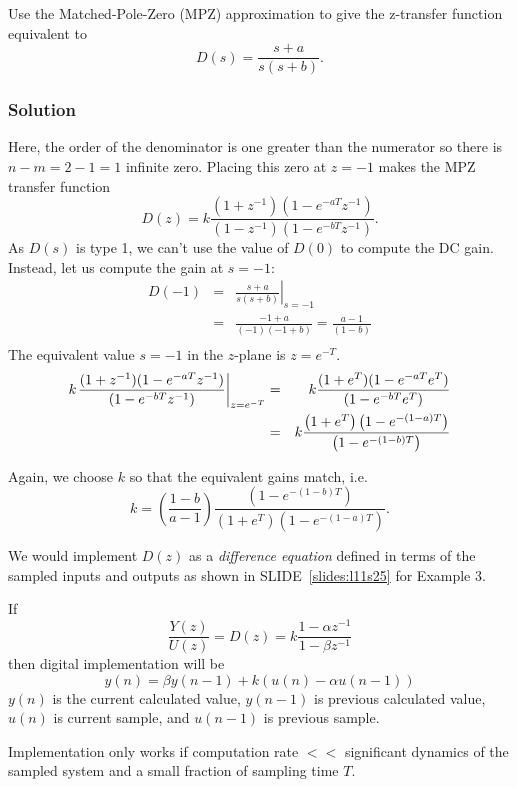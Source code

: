 \begin{slide}

Use the Matched-Pole-Zero (MPZ) approximation to give the z-transfer function equivalent to
$$D(s)=\frac{s+a}{s(s+b)}.$$
\end{slide}

\subsubsection*{Solution}
Here, the order of the denominator is one greater than the numerator so there is
$n-m = 2 - 1 = 1$ infinite zero. Placing this zero at $z = -1$ makes the MPZ transfer
function
$$D(z)=k\frac{(1+z^{-1})(1-e^{-aT}z^{-1})}{(1-z^{-1})(1 - e^{-bT}z^{-1})}.$$
As $D(s)$ is type 1, we can't use the value of $D(0)$ to compute the DC gain.
Instead, let us compute the gain at $s = -1$:
\begin{eqnarray*}
  D( - 1) &=& {\left. {\frac{{s + a}}{{s(s + b)}}} \right|_{s =  - 1}} \\
   &=& \frac{{-1 + a}}{{( - 1)(-1 + b)}} = \frac{{a - 1}}{{(1 - b)}} \\
\end{eqnarray*}
The equivalent value $s=-1$ in the $z$-plane is $z=e^{-T}$.
\begin{eqnarray*}
  k{\left. {\frac{{(1 + {z^{ - 1}})(1 - {e^{ - aT}}{z^{ - 1}})}}{{(1 - {e^{ - bT}}{z^{ - 1}})}}} \right|_{z = {e^{ - T}}}} &=& k\frac{{(1 + {e^T})(1 - {e^{ - aT}}{e^T})}}{{(1 - {e^{ - bT}}{e^T})}} \hfill \\
   &=& k\frac{{\left( {1 + {e^T}} \right)\left( {1 - {e^{ - (1 - a)T}}} \right)}}{{\left( {1 - {e^{ - (1 - b)T}}} \right)}} \hfill \\
\end{eqnarray*}

Again, we choose $k$ so that the equivalent gains match, i.e.
$$k =  \left( {\frac{{1 - b}}{{a - 1}}} \right)\frac{{\left( {1 - {e^{ - (1 - b)T}}} \right)}}{{\left( {1 + {e^T}} \right)\left( {1 - {e^{ - (1 - a)T}}} \right)}}.$$

We would implement $D(z)$ as a \emph{difference equation} defined in terms of the
sampled inputs and outputs as shown in SLIDE~\ref{slides:l11s25} for Example 3.
\begin{slide}\label{slides:l11s25}
	If $$\frac{Y(z)}{U(z)}=D(z)=k\frac{1-\alpha z^{-1}}{1-\beta z^{-1}}$$ then digital implementation will be
	$$y(n)=\beta y(n-1)+k(u(n)-\alpha u(n-1))$$
	$y(n)$ is the current calculated value, $y(n-1)$ is previous calculated value, $u(n)$ is current sample, and $u(n-1)$ is previous sample.

	Implementation only works if computation rate $<<$ significant dynamics of the sampled system and a small fraction of sampling time $T$.
\end{slide}

